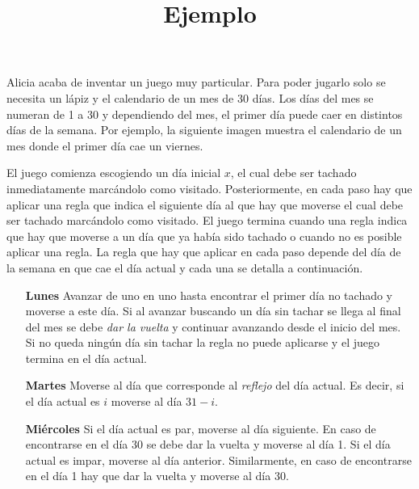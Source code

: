 \documentclass{oci}
\title{Ejemplo}
\begin{document}
\begin{problemDescription}
  Alicia acaba de inventar un juego muy particular.
  Para poder jugarlo solo se necesita un lápiz y el calendario de un mes de 30 días.
  Los días del mes se numeran de 1 a 30 y dependiendo del mes, el primer día puede caer
  en distintos días de la semana.
  Por ejemplo, la siguiente imagen muestra el calendario de un mes donde el primer día cae un viernes.
  \begin{center}
  \end{center}

  El juego comienza escogiendo un día inicial $x$, el cual debe ser tachado inmediatamente
  marcándolo como visitado.
  Posteriormente, en cada paso hay que aplicar una regla que indica el siguiente día al que hay
  que moverse el cual debe ser tachado marcándolo como visitado.
  El juego termina cuando una regla indica que hay que moverse a un día que ya había sido tachado
  o cuando no es posible aplicar una regla.
  La regla que hay que aplicar en cada paso depende del día de la semana en que cae el día actual
  y cada una se detalla a continuación.
  \begin{itemize}
   \item[\bf Lunes] Avanzar de uno en uno hasta encontrar el primer día no tachado y moverse a este día.
    Si al avanzar buscando un día sin tachar se llega al final del mes se debe \emph{dar la vuelta} y
    continuar avanzando desde el inicio del mes.
    Si no queda ningún día sin tachar la regla no puede aplicarse y el juego termina en el día actual.

    \item[\bf Martes] Moverse al día que corresponde al \emph{reflejo} del día actual.
    Es decir, si el día actual es $i$ moverse al día $31 - i$.

    \item[\bf Miércoles] Si el día actual es par, moverse al día siguiente.
    En caso de encontrarse en el día 30 se debe dar la vuelta y moverse al día 1.
    Si el día actual es impar, moverse al día anterior.
    Similarmente, en caso de encontrarse en el día 1 hay que dar la vuelta y moverse al día 30.


\end{itemize}
\end{problemDescription}
\end{document}
